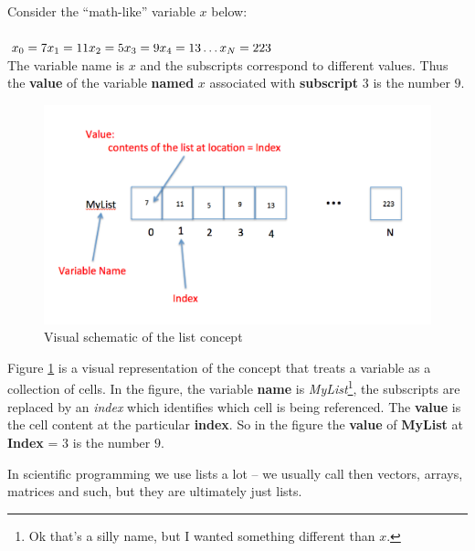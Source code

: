 Consider the ``math-like'' variable $x$ below:\\
~\\
\begin{math}
x_0 = 7 \\
x_1 = 11\\
x_2 = 5\\
x_3 = 9\\
x_4 = 13\\
\dots \\
x_N = 223\\
\end{math}\\
The variable name is $x$ and the subscripts correspond to different values.   Thus the \textbf{value} of the variable \textbf{named} $x$ associated with \textbf{subscript} $3$ is the number $9$.

\begin{figure}[h!] %
   \centering
   \includegraphics[width=5in]{./4-DataTypes/ListConcept.jpg} 
   \caption{Visual schematic of the list concept}
   \label{fig:ListConcept}
\end{figure}

Figure \ref{fig:ListConcept} is a visual representation of the concept that treats a variable as a collection of cells.  In the figure, the variable \textbf{name} is \textsl{MyList}\footnote{Ok that's a silly name, but I wanted something different than $x$.}, the subscripts are replaced by an \textsl{index} which identifies which cell is being referenced.  The \textbf{value} is the cell content at the particular \textbf{index}.   So in the figure the \textbf{value} of \textbf{MyList} at \textbf{Index} = 3 is the number $9$.

In scientific programming we use lists a lot -- we usually call then vectors, arrays, matrices and such, but they are ultimately just lists.

